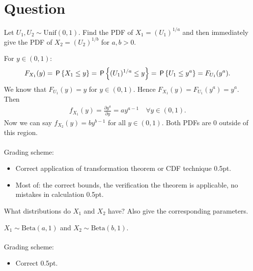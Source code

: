 \section*{Question}
\begin{exercise}[1]
Let $U_1,U_2\sim\text{Unif}(0,1)$. Find the PDF of $X_1 = (U_1)^{1/a}$ and then immediately give the PDF of $X_2 = (U_2)^{1/b}$ for $a,b>0$.
\begin{solution}
For $y\in(0,1)$:
\begin{align*}
    F_{X_1}(y) = \P{X_1\leq y} = \P{(U_1)^{1/a}\leq y} = \P{U_1\leq y^a} = F_{U_1}(y^a).
\end{align*}
We know that $F_{U_1}(y) = y$ for $y\in(0,1)$. Hence $F_{X_1}(y) =  F_{U_1}(y^a) = y^a$. Then
\begin{align*}
    f_{X_1}(y) = \frac{\partial y^a}{\partial y} = a y^{a-1}\quad\forall y\in(0,1).
\end{align*}
Now we can say $f_{X_2}(y) = b y^{b-1}$ for all $y\in(0,1)$. Both PDFs are 0 outside of this region.
\\\\
Grading scheme:
\begin{itemize}
    \item Correct application of transformation theorem or CDF technique 0.5pt.
    \item Most of: the correct bounds, the verification the theorem is applicable, no mistakes in calculation 0.5pt.
\end{itemize}
\end{solution}
\end{exercise}

\begin{exercise}[0.5]
What distributions do $X_1$ and $X_2$ have? Also give the corresponding parameters.
\begin{solution}
$X_1\sim\text{Beta}(a,1)$ and $X_2\sim\text{Beta}(b,1)$.
\\\\
Grading scheme:
\begin{itemize}
    \item Correct 0.5pt.
\end{itemize}
\end{solution}
\end{exercise}

